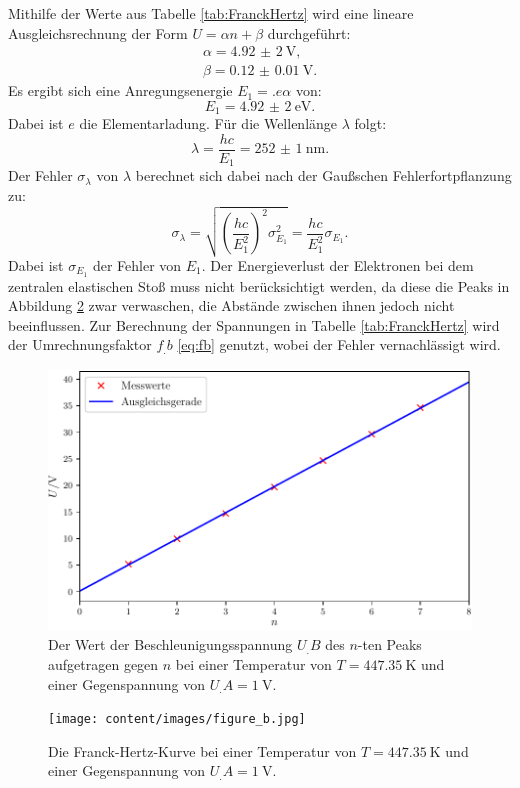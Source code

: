 Mithilfe der Werte aus Tabelle \ref{tab:FranckHertz} wird eine lineare Ausgleichsrechnung der Form $U = \alpha n+\beta$ durchgeführt:
\begin{align*}
\alpha = \SI{4,92(2)}{\volt}\text{,}\\
\beta = \SI{0.12(1)}{\volt}\text{.}
\end{align*}
Es ergibt sich eine Anregungsenergie $E_1 = .e\alpha$ von:
\[
E_1 = \SI{4,92(2)}{\electronvolt}\text{.}
\]
Dabei ist $e$ \cite{nistgov} die Elementarladung. Für die Wellenlänge $\lambda$ folgt:
\[
\lambda = \frac{hc}{E_1} = \SI{252(1)}{\nano\metre}\text{.}
\]
Der Fehler $\sigma_\lambda$ von $\lambda$ berechnet sich dabei nach der Gaußschen Fehlerfortpflanzung zu:
\[
\sigma_\lambda = \sqrt{\left(\frac{hc}{E_1^2}\right)^2\sigma_{E_1}^2} = \frac{hc}{E_1^2}\sigma_{E_1} \text{.}
\]
Dabei ist $\sigma_{E_1}$ der Fehler von $E_1$.
Der Energieverlust der Elektronen bei dem zentralen elastischen Stoß muss nicht berücksichtigt werden, da diese die Peaks in Abbildung \ref{fig:b} zwar verwaschen, die Abstände zwischen ihnen jedoch nicht beeinflussen. Zur Berechnung der Spannungen in Tabelle \ref{tab:FranckHertz} wird der Umrechnungsfaktor $f_.b$ \eqref{eq:fb} genutzt, wobei der Fehler vernachlässigt wird. 

\begin{figure}
\centering
\includegraphics[width=\linewidth-70pt,height=\textheight-70pt,keepaspectratio]{content/images/fig3.pdf}
\caption{Der Wert der Beschleunigungsspannung $U_.B$ des $n$-ten Peaks aufgetragen gegen $n$ bei einer Temperatur von $T=\SI{447,35}{\kelvin}$ und einer Gegenspannung von $U_.A=\SI{1}{\volt}$.}
\label{fig:3}
\end{figure}

\begin{figure}
\centering
\texttt{[image: content/images/figure\_b.jpg]}
\caption{Die Franck-Hertz-Kurve bei einer Temperatur von $T=\SI{447,35}{\kelvin}$ und einer Gegenspannung von $U_.A=\SI{1}{\volt}$.}
\label{fig:b}
\end{figure}

